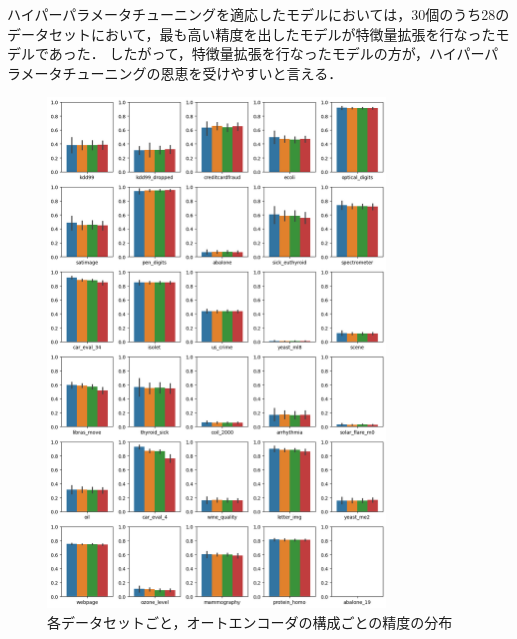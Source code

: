 ハイパーパラメータチューニングを適応したモデルにおいては，30個のうち28のデータセットにおいて，最も高い精度を出したモデルが特徴量拡張を行なったモデルであった．
したがって，特徴量拡張を行なったモデルの方が，ハイパーパラメータチューニングの恩恵を受けやすいと言える．\\


\begin{figure}
    \centering
    \includegraphics[width=0.8\textwidth]{figures/result-dataset.png}
    \caption{各データセットごと，オートエンコーダの構成ごとの精度の分布}
    \label{fig:compare-dataset}
\end{figure}

